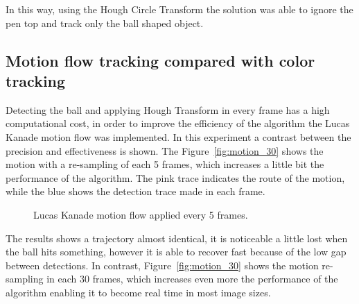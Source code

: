 \documentclass[10pt,twocolumn,letterpaper]{article}
\begin{document}
In this way,  using the Hough Circle Transform the solution was able to ignore the pen top and track only the ball shaped object.

\subsection{Motion flow tracking compared with color tracking}

Detecting the ball and applying Hough Transform in every frame has a high computational cost, in order to improve the efficiency of the algorithm the Lucas Kanade motion flow was implemented. In this experiment a contrast between the precision and effectiveness is shown. The Figure~\ref{fig:motion_30} shows the motion with a re-sampling of each 5 frames, which increases a little bit the performance of the algorithm. The pink trace indicates the route of the motion, while the blue shows the detection trace made in each frame.

\begin{figure}[!h]
	\centering
	\setlength{\fboxsep}{1pt}
	\setlength{\fboxrule}{1pt}
	\caption{Lucas Kanade motion flow applied every 5 frames.}\label{fig:motion_5}
\end{figure}

The results shows a trajectory almost identical, it is noticeable a little lost when the ball hits something, however it is able to recover fast because of the low gap between detections. In contrast, Figure~\ref{fig:motion_30} shows the motion re-sampling in each 30 frames, which increases even more the performance of the algorithm enabling it to become real time in most image sizes.
\end{document}
